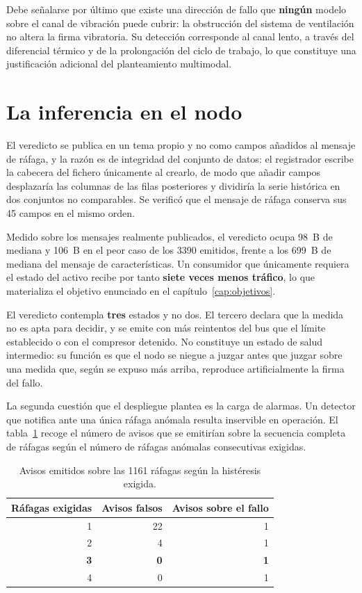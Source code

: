 Debe señalarse por último que existe una dirección de fallo que \textbf{ningún} modelo sobre el
canal de vibración puede cubrir: la obstrucción del sistema de ventilación no altera la firma
vibratoria. Su detección corresponde al canal lento, a través del diferencial térmico y de la
prolongación del ciclo de trabajo, lo que constituye una justificación adicional del
planteamiento multimodal.

\section{La inferencia en el nodo}

El veredicto se publica en un tema propio y no como campos añadidos al mensaje de ráfaga, y la
razón es de integridad del conjunto de datos: el registrador escribe la cabecera del fichero
únicamente al crearlo, de modo que añadir campos desplazaría las columnas de las filas
posteriores y dividiría la serie histórica en dos conjuntos no comparables. Se verificó que el
mensaje de ráfaga conserva sus 45 campos en el mismo orden.

Medido sobre los mensajes realmente publicados, el veredicto ocupa \mbox{98 B} de mediana y
\mbox{106 B} en el peor caso de los 3390 emitidos, frente a los \mbox{699 B} de mediana del
mensaje de características. Un consumidor que únicamente requiera el estado del activo recibe por
tanto \textbf{siete veces menos tráfico}, lo que materializa el objetivo enunciado en el
capítulo~\ref{cap:objetivos}.

El veredicto contempla \textbf{tres} estados y no dos. El tercero declara que la medida no es
apta para decidir, y se emite con más reintentos del bus que el límite establecido o con el
compresor detenido. No constituye un estado de salud intermedio: su función es que el nodo se
niegue a juzgar antes que juzgar sobre una medida que, según se expuso más arriba, reproduce
artificialmente la firma del fallo.

La segunda cuestión que el despliegue plantea es la carga de alarmas. Un detector que notifica ante una única ráfaga anómala resulta inservible en operación. El
tabla~\ref{table:histeresis} recoge el número de avisos que se emitirían sobre la secuencia
completa de ráfagas según el número de ráfagas anómalas consecutivas exigidas.

\begin{table}[ht!]
\caption{Avisos emitidos sobre las 1161 ráfagas según la histéresis exigida.}
\label{table:histeresis}
\centering
\begin{tabular}{|r|r|r|}
\hline
\textbf{Ráfagas exigidas} & \textbf{Avisos falsos} & \textbf{Avisos sobre el fallo} \\
\hline
1 & 22 & 1 \\
\hline
2 & 4 & 1 \\
\hline
\textbf{3} & \textbf{0} & \textbf{1} \\
\hline
4 & 0 & 1 \\
\hline
\end{tabular}
\end{table}

